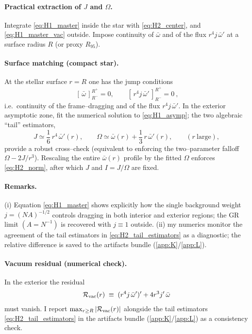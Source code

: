 \documentclass{iopjournal}
\begin{document}
\paragraph{Practical extraction of $J$ and $\Omega$.}
Integrate \eqref{eq:H1_master} inside the star with \eqref{eq:H2_center}, and \eqref{eq:H1_master_vac} outside. Impose continuity of $\bar\omega$ and of the flux $r^{4}j\,\bar\omega'$ at a surface radius $R$ (or proxy $R_{95}$). \paragraph{Surface matching (compact star).}
At the stellar surface $r=R$ one has the jump conditions
\begin{equation}
\boxed{\ [\,\bar\omega\,]_{R^-}^{R^+}=0,\qquad
[\,r^{4}j\,\bar\omega'\,]_{R^-}^{R^+}=0\ },
\label{eq:H2_matching}
\end{equation}
i.e.\ continuity of the frame–dragging and of the flux $r^{4}j\,\bar\omega'$.
In the exterior asymptotic zone, fit the numerical solution to \eqref{eq:H1_asymp}; the two algebraic ``tail'' estimators,
\begin{equation}
J\simeq \frac{1}{6}\,r^{4}\,\bar\omega'(r),\qquad
\Omega\simeq \bar\omega(r)+\frac{1}{3}\,r\,\bar\omega'(r),
\qquad (r\ \text{large}),
\label{eq:H2_tail_estimators}
\end{equation}
provide a robust cross–check (equivalent to enforcing the two–parameter falloff $\Omega-2J/r^{3}$). Rescaling the entire $\bar\omega(r)$ profile by the fitted $\Omega$ enforces \eqref{eq:H2_norm}, after which $J$ and $I=J/\Omega$ are fixed.

\paragraph{Remarks.}
(i) Equation \eqref{eq:H1_master} shows explicitly how the single background weight $j=(NA)^{-1/2}$ controls dragging in both interior and exterior regions; the GR limit $(A=N^{-1})$ is recovered with $j\equiv1$ outside. (ii) my numerics monitor the agreement of the tail estimators in \eqref{eq:H2_tail_estimators} as a diagnostic; the relative difference is saved to the artifacts bundle (\cref{app:K}/\cref{app:L}).
\paragraph{Vacuum residual (numerical check).}
In the exterior the residual
\begin{equation}
\mathcal{R}_{\rm vac}(r)\;\equiv\;(r^{4}j\,\bar\omega')'+4r^{3}j'\,\bar\omega
\label{eq:H2_residual}
\end{equation}
must vanish. I report $\max_{r\ge R}|\mathcal{R}_{\rm vac}(r)|$ alongside the tail estimators \eqref{eq:H2_tail_estimators} in the artifacts bundle (\cref{app:K}/\cref{app:L}) as a consistency check.
\end{document}
